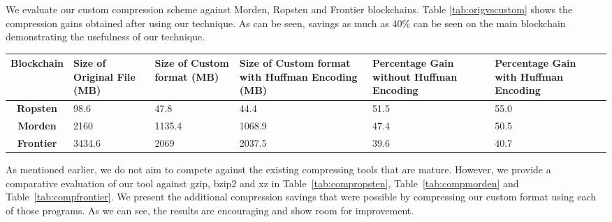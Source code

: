 
We evaluate our custom compression scheme against Morden, Ropsten and Frontier blockchains.
Table \ref{tab:origvscustom} shows the compression gains obtained after using our technique.
As can be seen, savings as much as 40\% can be seen on the main blockchain demonstrating the usefulness
of our technique.
\begin{table*}
	\centering
\captionsetup{justification=centering}
\begin{tabular}{ >{\bfseries}c| p{2cm} | p{2cm} | p{2cm} |p{1.5cm} |p{1.5cm} }
	Blockchain& {Size of Original File (MB)} & {\par{Size of Custom format \newline (MB)}} & {Size of Custom format with Huffman Encoding (MB)} & \par{Percentage Gain without Huffman Encoding}  & \par{Percentage Gain with Huffman Encoding} \\
  \hline
  Ropsten & 98.6 & 47.8  & 44.4 &51.5  & 55.0\\
  Morden & 2160 & 1135.4 &1068.9 & 47.4 & 50.5 \\
  Frontier  & 3434.6  & 2069 & 2037.5 & 39.6 & 40.7\\
\end{tabular}
\caption{Compression gains using our custom format with and without Huffman encoding} 
\label{tab:origvscustom}
\end{table*}

As mentioned earlier, we do not aim to compete against the existing compressing tools that are mature.
However, we provide a comparative evaluation of our tool against gzip, bzip2 and xz in
Table~\ref{tab:compropsten}, Table~\ref{tab:compmorden} and Table~\ref{tab:compfrontier}. 
We present the additional compression savings that were possible by compressing 
our custom format using each of those programs.
As we can see, the results are encouraging and show room for improvement.

